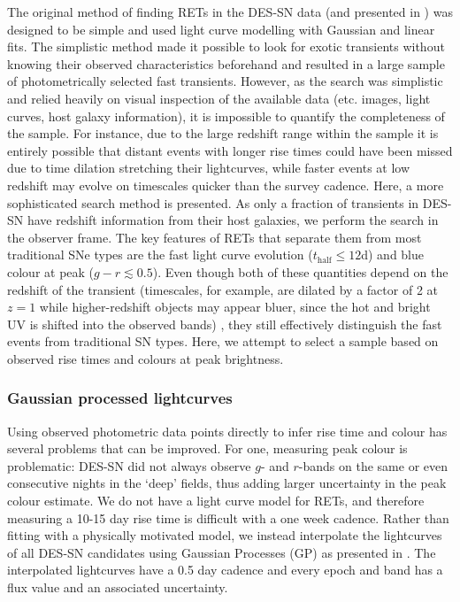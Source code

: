 \documentclass[fleqn,usenatbib,]{mnras}
\newcommand{\replyref}[1]{\color{magenta}#1 \color{black}}
\begin{document}
The original method of finding RETs in the DES-SN data (and presented in ) was designed to be simple and used light curve modelling with Gaussian and linear fits. The simplistic method made it possible to look for exotic transients without knowing their observed characteristics beforehand and resulted in a large sample of photometrically selected fast transients. However, as the search was simplistic and relied heavily on visual inspection of the available data (etc. images, light curves, host galaxy information), it is impossible to quantify the completeness of the sample. For instance, due to the large redshift range within the sample it is entirely possible that distant events with longer rise times could have been missed due to time dilation stretching their lightcurves, while faster events \replyref{at} low redshift may evolve on timescales quicker than the survey cadence. Here, a more sophisticated search method is presented. As only a fraction of transients in DES-SN have redshift information from their host galaxies, we perform the search in the observer frame. The key features of RETs that separate them from most traditional SNe types are the fast light curve evolution \replyref{($t_{\mathrm{half}}\leq12$d)} and blue colour at peak ($g-r \lesssim 0.5$). Even though both of these quantities depend on the redshift of the transient \replyref{(timescales, for example, are dilated by a factor of 2 at $z=1$ while higher-redshift objects may appear bluer, since the hot and bright UV is shifted into the observed bands)}, they still effectively distinguish the fast events from traditional SN types. \replyref{Here, we} attempt to select a sample based on observed rise times and colours at peak brightness.

\subsubsection{Gaussian processed lightcurves}
Using observed photometric data points directly to infer rise time and colour has several problems that can be improved. For one, measuring peak colour is problematic: DES-SN did not always observe $g$- and $r$-bands on the same or even consecutive nights in the `deep' fields, thus adding larger uncertainty in the peak colour estimate. We do not have a light curve model for RETs, and therefore measuring a 10-15 day rise time is difficult with a one week cadence. Rather than fitting with a physically motivated model, we instead interpolate the lightcurves of all DES-SN candidates using Gaussian Processes (GP) as presented in \citet{Pursiainen2020}. The interpolated lightcurves have a 0.5 day cadence and every epoch and band has a flux value and an associated uncertainty. 
\end{document}
